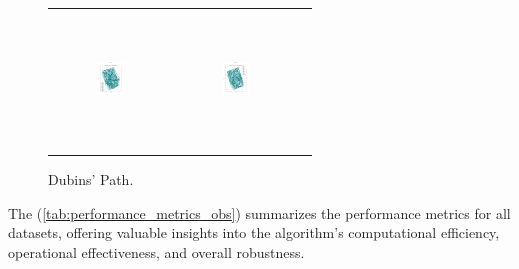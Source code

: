 \begin{figure}[htbp]
\begin{tabular}{ccc}
        \includegraphics[height=36mm,width=0.24\textwidth]{Images/simulation_obs/obs_dubins/4.png}
        & \includegraphics[height=36mm,width=0.24\textwidth]{Images/simulation_obs/obs_dubins/5.png} 

    \end{tabular}
    \caption{Dubins' Path.\label{fig:dubins_path_obs}}
\end{figure}

\vspace*{6mm}  

The (\autoref{tab:performance_metrics_obs}) summarizes the performance metrics for all datasets, offering valuable insights into the algorithm's computational efficiency, operational effectiveness, and overall robustness.

